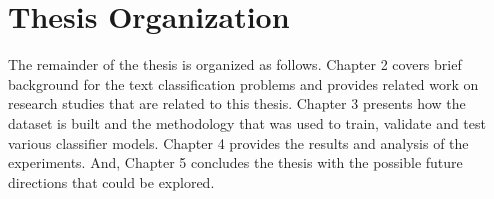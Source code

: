 \section{Thesis Organization} \label{intro:organization}
The remainder of the thesis is organized as follows. Chapter 2 covers brief background for the text classification problems and provides related work on research studies that are related to this thesis. Chapter 3 presents how the dataset is built and the methodology that was used to train, validate and test various classifier models. Chapter 4  provides the results and analysis of the experiments. And, Chapter 5 concludes the thesis with the possible future directions that could be explored.